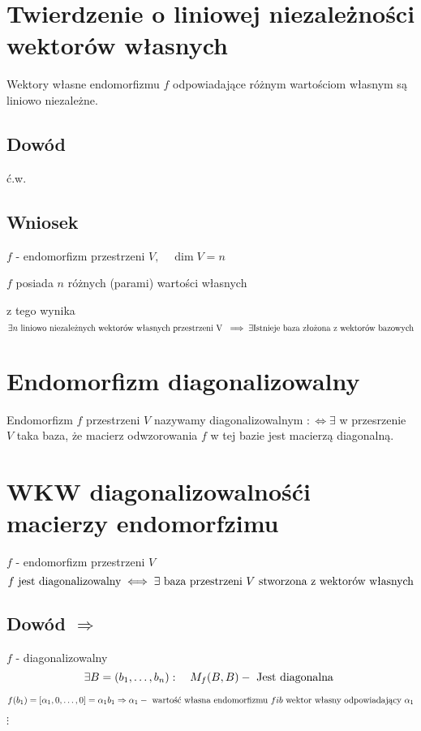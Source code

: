 \documentclass[11pt]{article}
\begin{document}
\newpage
\section{Twierdzenie o liniowej niezależności wektorów własnych}

Wektory własne endomorfizmu $f$ odpowiadające różnym wartościom własnym są liniowo niezależne.

\subsection{Dowód}
ć.w.

\subsection{Wniosek}
$f$ - endomorfizm przestrzeni $V, \quad \dim{V} = n $

$f$ posiada $n$ różnych (parami) wartości własnych 

z tego wynika $$ \exists n \hbox{ liniowo niezależnych wektorów własnych przestrzeni V } \implies \exists \hbox{Istnieje baza złożona z wektorów bazowych} $$

\section{Endomorfizm diagonalizowalny}
Endomorfizm $f$ przestrzeni $V$ nazywamy diagonalizowalnym $:\iff \exists$ w przesrzenie $V$ taka baza, że macierz odwzorowania $f$ w tej bazie jest macierzą diagonalną. 

\section{WKW diagonalizowalnośći macierzy endomorfzimu}
$f$  - endomorfizm przestrzeni $V$
$$ f \hbox{ jest diagonalizowalny} \iff \exists \hbox { baza przestrzeni } V \hbox{ stworzona z wektorów własnych} $$

\subsection{Dowód $\Rightarrow$}
$f$ - diagonalizowalny
$$ \exists B = (b_1,\ldots,b_n) : \quad M_f(B,B) - \hbox{ Jest diagonalna } $$

$f(b_1) = [\alpha_1 , 0 , \ldots, 0]  = \alpha_1 b_1 \Rightarrow \alpha_1 - \hbox{ wartość własna endomorfizmu } f i b \hbox{ wektor własny odpowiadający } \alpha_1$

$ \vdots $
\end{document}
